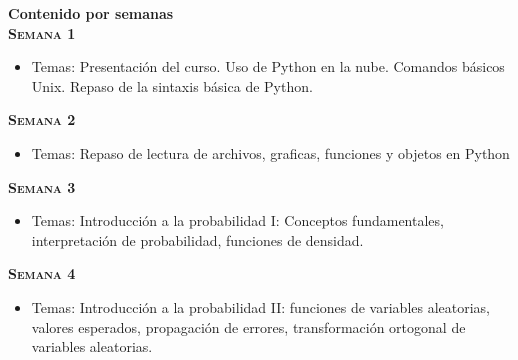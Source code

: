 \documentclass[letterpaper,10pt,onecolumn]{article}
\begin{document}
\vspace*{0.5cm} 

\newpage
{}
\noindent\textbf{\large {} \quad Contenido por
  semanas}\\[-0.2cm]  


\noindent\textbf{\textsc{Semana 1}}\\[-0.5cm]
\begin{itemize}
\item Temas: 
Presentaci\'on del curso. Uso de Python en la nube. Comandos b\'asicos Unix. 
Repaso de la sintaxis b\'asica de Python. \\[-0.6cm] 
\end{itemize}


\noindent\textbf{\textsc{Semana 2}} \\[-0.5cm]
\begin{itemize}
\item Temas: 
Repaso de lectura de archivos, graficas, funciones y objetos en Python \\[-0.6cm] 
\end{itemize}

\noindent\textbf{\textsc{Semana 3}}\\[-0.5cm]
\begin{itemize}
\item Temas:  Introducci\'on a la probabilidad I: Conceptos fundamentales, interpretaci\'on de probabilidad, funciones de densidad. \\[-0.6cm]
\end{itemize}

\noindent\textbf{\textsc{Semana 4}}\\[-0.5cm]
\begin{itemize}
\item Temas:  Introducci\'on a la probabilidad II: funciones de variables aleatorias, valores esperados, propagaci\'on de errores, transformaci\'on ortogonal de variables aleatorias. \\[-0.6cm]
\end{itemize}
\end{document}

